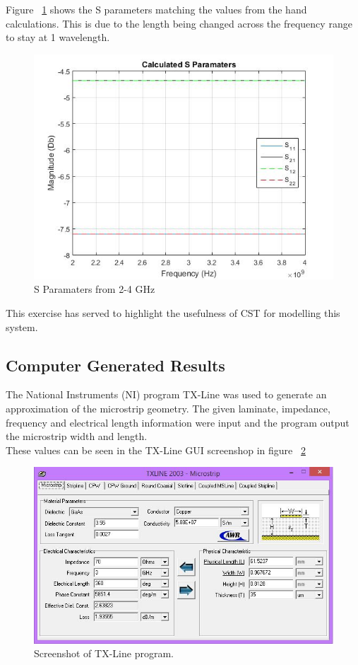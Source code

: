 \documentclass{paper}
\begin{document}
Figure ~\ref{fig:varying_l} shows the S parameters matching the values from the hand calculations. This is due to the length being changed across the frequency range to stay at 1 wavelength.

\begin{figure}[H]
	\centering
	\includegraphics[scale=0.5]{IMG/varying_l}
	\caption{S Paramaters from 2-4 GHz}
	\label{fig:varying_l}
\end{figure}

This exercise has served to highlight the usefulness of CST for modelling this system.


\subsection{Computer Generated Results}
\label{sec:tx-line}
The National Instruments (NI) program TX-Line was used to generate an approximation of the microstrip geometry. The given laminate, impedance, frequency and electrical length information were input and the program output the microstrip width and length. \\

These values can be seen in the TX-Line GUI screenshop in figure ~\ref{fig:txline}  

\begin{figure}[H]
	\centering
	\includegraphics[scale=0.6]{IMG/txline}
	\caption{Screenshot of TX-Line program.}
	\label{fig:txline}
\end{figure}
\end{document}
